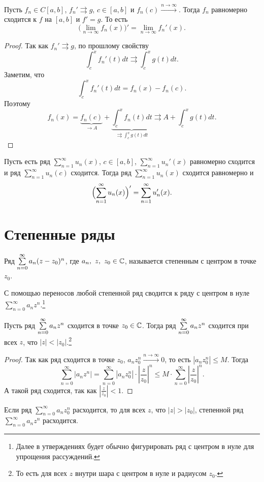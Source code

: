 \begin{enumerate}
	Пусть $ f_n \in C[a, b]$, $ f_n' \rightrightarrows g$, $ c \in  [a, b]$ и $ f_n(c) \stackrel{n \to \infty}{\longrightarrow}$. 
	Тогда $ f_n$ равномерно сходится к $ f$ на $ [a, b]$ и $ f' = g$.
	То есть
	\[
		\bigl( \lim_{n \to \infty} f_n(x) \bigr)' = \lim_{n \to \infty} f_n'(x)
	.\] 
	\begin{proof}
		Так как $ f_n ' \rightrightarrows g$, по прошлому свойству 
		\[
			\int_{c}^{x} f_n'(t) dt \rightrightarrows \int_{c}^{x} g(t) dt  
		.\] 
		Заметим, что
		\[
			\int_{c}^{x} f_n'(t) dt  = f_n(x) - f_n(c)
		.\] 
		Поэтому
		\[
			f_n(x) = \underbrace{f_n(c)}_{ \to A} + \underbrace{\int_{c}^{x} f_n(t) dt}_{\rightrightarrows \int_{c}^{x} g(t) dt   } \rightrightarrows A + \int_{c}^{x} g(t) dt 
		.\] 
	\end{proof}
	\begin{cor}
		Пусть есть ряд $ \sum_{n=1}^{\infty} u_n(x)$, $ c \in [a, b]$, $ \sum_{n=1}^{\infty} u_n'(x)$ равномерно сходится и ряд $ \sum_{n=1}^{\infty} u_n(c) $ сходится. Тогда ряд $ \sum_{n=1}^{\infty} u_n(x)$ сходится равномерно и
		\[
			\Bigl(\sum_{n=1}^{\infty} u_n(x)\Bigr)' = \sum_{n=1}^{\infty} u_n'(x)
		.\] 
	\end{cor}
\end{enumerate}

\section{Степенные ряды}
\begin{defn}
	Ряд $ \sum\limits_{n=0}^{\infty} a_n(z-z_0)^{n}$, где $ a_n, ~ z, ~ z_0 \in \mathbb{C}$, называется {\sf степенным с центром в точке $ z_0$}. 
\end{defn}
\begin{note}
	С помощью переносов любой степенной ряд сводится к ряду с центром в нуле $ \sum_{n=0}^{\infty}a_n z^{n} $.\footnote{Далее в утверждениях будет обычно фигурировать ряд с центром в нуле для упрощения рассуждений.}
\end{note}
\begin{thm}
Пусть ряд $ \sum\limits_{n=0}^{\infty} a_n z^{n}$ сходится в точке $ z_0 \in \mathbb{C}$. Тогда ряд $ \sum\limits_{n=0}^{\infty} a_n z^{n}$ сходится при всех $ z$, что $ \lvert z \rvert < \lvert z_0 \rvert $.\footnote{То есть для всех $ z$ внутри шара с центром в нуле и радиусом  $ z_0$.}
\end{thm}
\begin{proof}
    Так как ряд сходится в точке $ z_0$, $ a_n z_0^{n} \stackrel{n \to  \infty}{\longrightarrow} 0$, то есть $ \left| a_n z_0^{n} \right| \le M$.
	Тогда
	\[
		\sum_{n=0}^{\infty} \left| a_n z^{n}\right|  = \sum_{n=0}^{\infty} \left| a_n z_0^{n} \right| \cdot \left| \frac{z}{z_0} \right| ^{n} \le M \cdot \sum_{n=0}^{\infty} \left| \frac{z}{z_0} \right| ^{n}
	.\] 
	А такой ряд сходится, так как $ \left| \frac{z}{z_0} \right| < 1$.
\end{proof}
\begin{cor}
    Если ряд $ \sum\limits_{n=0}^{\infty} a_n z^{n}_0 $ расходится, то для всех $ z$, что  $ \lvert z \rvert >\lvert z_0 \rvert $, степенной ряд $ \sum\limits_{n=0}^{\infty} a_n z^{n}$ расходится.
\end{cor}


